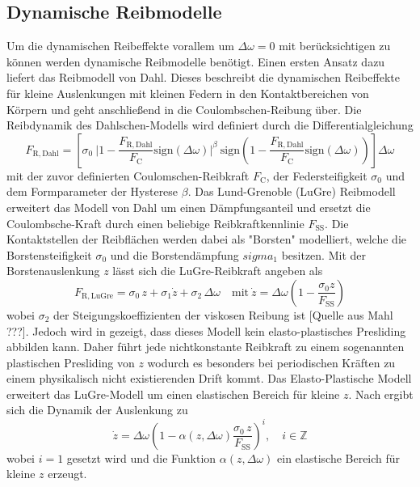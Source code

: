 \subsection{Dynamische Reibmodelle}
Um die dynamischen Reibeffekte vorallem um $\Delta\omega=0$ mit berücksichtigen zu können werden dynamische Reibmodelle benötigt. Einen ersten Ansatz dazu liefert das Reibmodell von Dahl. Dieses beschreibt die dynamischen Reibeffekte für kleine Auslenkungen mit kleinen Federn in den Kontaktbereichen von Körpern und geht anschließend in die Coulombschen-Reibung über\cite{Schroeder.2015}. Die Reibdynamik des Dahlschen-Modells wird definiert durch die Differentialgleichung
\begin{equation}
F_\mathrm{R,Dahl} = \left[\sigma_0\ \vert 1-\frac{F_\mathrm{R,Dahl}}{F_\mathrm{C}}\mathrm{sign}(\Delta\omega)\vert^\beta\ \mathrm{sign}\left( 1-\frac{F_\mathrm{R,Dahl}}{F_\mathrm{C}}\mathrm{sign}(\Delta\omega)\right)\right]\Delta\omega
\end{equation}
mit der zuvor definierten Coulomschen-Reibkraft $F_\mathrm{C}$, der Federsteifigkeit $\sigma_0$ und dem Formparameter der Hysterese $\beta$. Das Lund-Grenoble (LuGre) Reibmodell erweitert das Modell von Dahl um einen Dämpfungsanteil und ersetzt die Coulombsche-Kraft durch einen beliebige Reibkraftkennlinie $F_\mathrm{SS}$. Die Kontaktstellen der Reibflächen werden dabei als "Borsten"  modelliert, welche die Borstensteifigkeit $\sigma_0$ und die Borstendämpfung $sigma_1$ besitzen. Mit der Borstenauslenkung $z$ lässt sich die LuGre-Reibkraft angeben als
\begin{equation}
F_\mathrm{R,LuGre} = \sigma_0\, z + \sigma_1 \dot{z} + \sigma_2\, \Delta \omega\quad \mathrm{mit}\  \dot{z}=\Delta\omega\left(1-\frac{\sigma_0 z}{F_\mathrm{SS}}\right)
\end{equation} 
wobei $\sigma_2$ der Steigungskoeffizienten der viskosen Reibung ist [Quelle aus Mahl ???]. Jedoch wird in \cite{Dupont.2002} gezeigt, dass dieses Modell kein elasto-plastisches Presliding abbilden kann. Daher führt jede nichtkonstante Reibkraft zu einem sogenannten plastischen Presliding von $z$ wodurch es besonders bei periodischen Kräften zu einem physikalisch nicht existierenden Drift kommt. Das Elasto-Plastische Modell erweitert das LuGre-Modell um einen elastischen Bereich für kleine $z$. Nach \cite{Dupont.2000} ergibt sich die Dynamik der Auslenkung zu 
\begin{equation}
\dot{z} = \Delta \omega \left(1-\alpha(z,\Delta \omega)\frac{\sigma_0\,z}{F_\mathrm{SS}}\right)^i,\quad i\in \mathbb{Z}
\end{equation}
wobei $i=1$ gesetzt wird und die Funktion $\alpha(z,\Delta \omega)$ ein elastische Bereich für kleine $z$ erzeugt.

